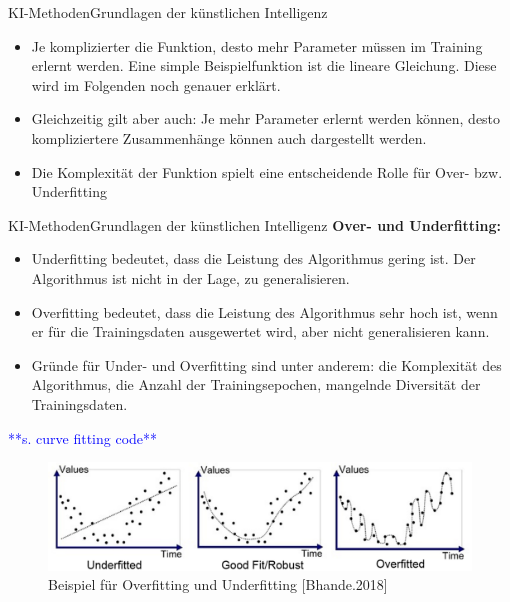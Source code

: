 \documentclass[169, handout	]{THIbeamer} %
\begin{document}
	\begin{frame}{KI-Methoden}{Grundlagen der künstlichen Intelligenz}
	\small		
	\begin{itemize}
		\item Je komplizierter die Funktion, desto mehr Parameter müssen im Training erlernt werden. Eine simple Beispielfunktion ist die lineare Gleichung. Diese wird im Folgenden noch genauer erklärt.
		\item Gleichzeitig gilt aber auch: Je mehr Parameter erlernt werden können, desto kompliziertere Zusammenhänge können auch dargestellt werden. 
		\item Die Komplexität der Funktion spielt eine entscheidende Rolle für Over- bzw. Underfitting
	\end{itemize}
\end{frame}



	\begin{frame}{KI-Methoden}{Grundlagen der künstlichen Intelligenz}
	\footnotesize		
	\textbf{Over- und Underfitting:}	
	\begin{itemize}
		\item Underfitting bedeutet, dass die Leistung des Algorithmus gering ist. Der Algorithmus ist nicht in der Lage, zu generalisieren.		
		\item Overfitting bedeutet, dass die Leistung des Algorithmus sehr hoch ist, wenn er für die Trainingsdaten ausgewertet wird, aber nicht generalisieren kann.
		\item Gründe für Under- und Overfitting sind unter anderem: die Komplexität des Algorithmus, die Anzahl der Trainingsepochen, mangelnde Diversität der Trainingsdaten.
	\end{itemize}
\textcolor{blue}{**s. curve fitting code**}
	\begin{figure}
		\includegraphics[scale=0.25]{required/Over and Underfitting.png}
		\caption{\scriptsize Beispiel für Overfitting und Underfitting [Bhande.2018]}
		\label{Over and Underfitting}
	\end{figure}
\end{frame}
\end{document}
